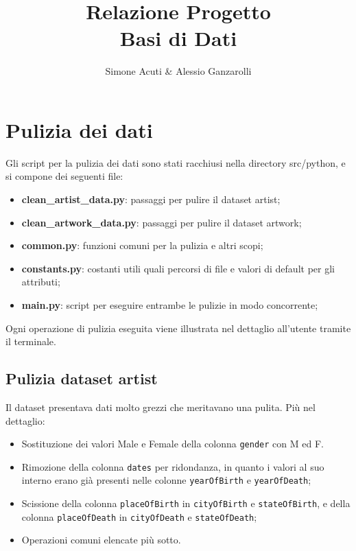\documentclass{ol-softwaremanual}
\title{Relazione Progetto \\Basi di Dati}
\author{Simone Acuti \& Alessio Ganzarolli}
\begin{document}
\maketitle

\tableofcontents
\newpage

\section{Pulizia dei dati}

Gli script per la pulizia dei dati sono stati racchiusi nella directory src/python, e si compone dei seguenti file:
\begin{itemize}
    \item \textbf{clean\_artist\_data.py}: passaggi per pulire il dataset artist;
    \item \textbf{clean\_artwork\_data.py}: passaggi per pulire il dataset artwork;
    \item \textbf{common.py}: funzioni comuni per la pulizia e altri scopi;
    \item \textbf{constants.py}: costanti utili quali percorsi di file e valori di default per gli attributi;
    \item \textbf{main.py}: script per eseguire entrambe le pulizie in modo concorrente;
\end{itemize}
Ogni operazione di pulizia eseguita viene illustrata nel dettaglio all’utente tramite il terminale.

\subsection{Pulizia dataset artist}
Il dataset presentava dati molto grezzi che meritavano una pulita. Più nel dettaglio:
\begin{itemize}
    \item Sostituzione dei valori Male e Female della colonna \verb|gender| con M ed F.
    \item Rimozione della colonna \verb|dates| per ridondanza, in quanto i valori al suo interno erano già presenti 
    nelle colonne \verb|yearOfBirth| e \verb|yearOfDeath|;
    \item Scissione della colonna \verb|placeOfBirth| in \verb|cityOfBirth| e \verb|stateOfBirth|, e della colonna \verb|placeOfDeath| in 
    \verb|cityOfDeath| e \verb|stateOfDeath|;
    \item Operazioni comuni elencate più sotto.
\end{itemize}
\end{document}
